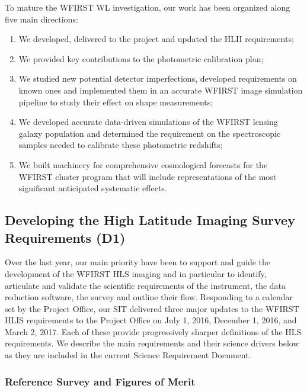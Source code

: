 \begin{summary}
To mature the WFIRST WL investigation, our work has been organized along five main
directions:
\begin{enumerate}
  \item We developed, delivered to the project and
updated the HLII requirements;
\item We provided key contributions to the
photometric calibration plan;
\item We studied new potential detector imperfections,
developed requirements on known ones and implemented them in an accurate
WFIRST image simulation pipeline to study their effect on shape measurements;
\item We developed accurate data-driven simulations of the WFIRST lensing galaxy population and determined the
requirement on the spectroscopic samples needed to calibrate these photometric redshifts;
\item We built machinery for comprehensive cosmological forecasts for the WFIRST cluster program that
will include representations of the most significant anticipated systematic effects.
\end{enumerate}
\end{summary}


 \subsection{Developing the High Latitude Imaging Survey Requirements (D1)}

 \begin{summaryii}
   Over the last year, our main priority have been to support and guide the
   development of the WFIRST HLS imaging and in particular to identify,
   articulate and validate the scientific requirements of the instrument, the
   data reduction software, the survey and outline their flow. Responding to a calendar set by the
   Project Office, our SIT delivered three major updates to the WFIRST HLIS
   requirements to the Project Office on July 1, 2016, December 1, 2016, and
   March 2, 2017. Each of these provide progressively sharper definitions of the
   HLS requirements. We describe the main requirements and their science drivers
   below as they are included in the current Science Requirement Document.
 \end{summaryii}

\subsubsection{Reference Survey and Figures of Merit}

